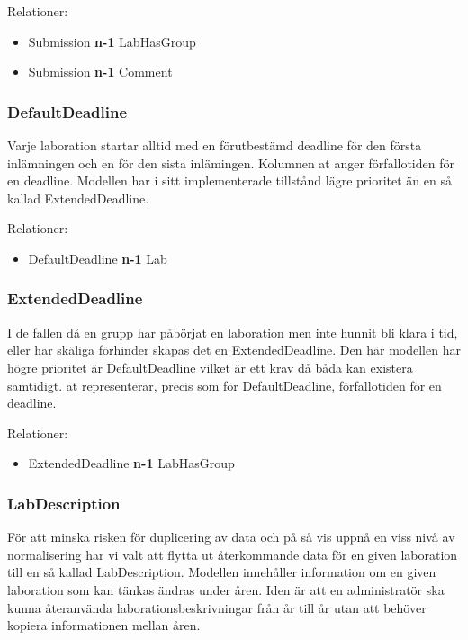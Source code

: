 Relationer: 
\begin{itemize}
  \item Submission {\bf n-1} LabHasGroup 
  \item Submission {\bf n-1} Comment
\end{itemize}

\subsubsection{DefaultDeadline}

Varje laboration startar alltid med en förutbestämd deadline för den första inlämningen och en för den sista inlämingen. Kolumnen at anger förfallotiden för en deadline. Modellen har i sitt implementerade tillstånd lägre prioritet än en så kallad ExtendedDeadline.

Relationer: 
\begin{itemize}
  \item DefaultDeadline {\bf n-1} Lab
\end{itemize}

\subsubsection{ExtendedDeadline}

I de fallen då en grupp har påbörjat en laboration men inte hunnit bli klara i tid, eller har skäliga förhinder skapas det en ExtendedDeadline. Den här modellen har högre prioritet är DefaultDeadline vilket är ett krav då båda kan existera samtidigt. at representerar, precis som för DefaultDeadline, förfallotiden för en deadline.

Relationer: 
\begin{itemize}
  \item ExtendedDeadline {\bf n-1} LabHasGroup
\end{itemize}

\subsubsection{LabDescription}
För att minska risken för duplicering av data och på så vis uppnå en viss nivå av normalisering har vi valt att flytta ut återkommande data för en given laboration till en så kallad LabDescription. Modellen innehåller information om en given laboration som kan tänkas ändras under åren. Iden är att en administratör ska kunna återanvända laborationsbeskrivningar från år till år utan att behöver kopiera informationen mellan åren.

